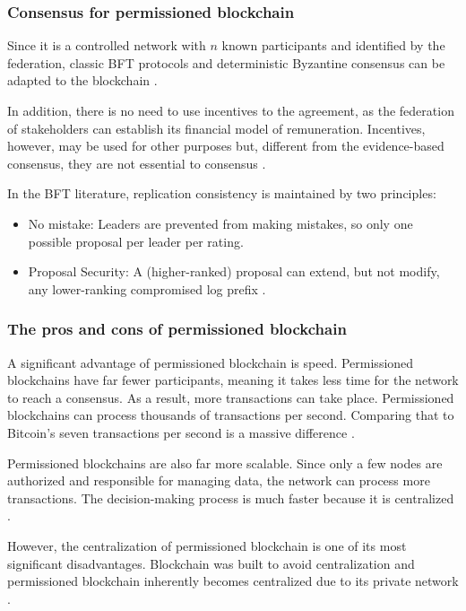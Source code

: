 \subsubsection{Consensus for permissioned blockchain}\label{sec:consensoPrivada}
Since it is a controlled network with $n$ known participants and identified by the federation, classic \acf{BFT} protocols and deterministic Byzantine consensus can be adapted to the blockchain \cite{androulaki2018hyperledger}.

In addition, there is no need to use incentives to the agreement, as the federation of stakeholders can establish its financial model of remuneration. Incentives, however, may be used for other purposes but, different from the evidence-based consensus, they are not essential to consensus \cite{greve2018blockchain}.

In the \ac{BFT} literature, replication consistency is maintained by two principles:

\begin{itemize}
\item No mistake: Leaders are prevented from making mistakes, so only one possible proposal per leader per rating.
\item Proposal Security: A (higher-ranked) proposal can extend, but not modify, any lower-ranking compromised log prefix \cite{abraham2017blockchain}.
\end{itemize}

\subsubsection{The pros and cons of permissioned blockchain}\label{sec:prosConsPriv}

A significant advantage of permissioned blockchain is speed. Permissioned blockchains have far fewer participants, meaning it takes less time for the network to reach a consensus. As a result, more transactions can take place. Permissioned blockchains can process thousands of transactions per second. Comparing that to Bitcoin's seven transactions per second is a massive difference \cite{di17blockchain}.

Permissioned blockchains are also far more scalable. Since only a few nodes are authorized and responsible for managing data, the network can process more transactions. The decision-making process is much faster because it is centralized \cite{selfkeyOrg}.

However, the centralization of permissioned blockchain is one of its most significant disadvantages. Blockchain was built to avoid centralization and permissioned blockchain inherently becomes centralized due to its private network \cite{blockgeeks2018deeper}.

